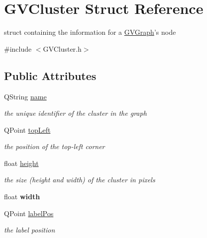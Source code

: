 \hypertarget{struct_g_v_cluster}{\section{\-G\-V\-Cluster \-Struct \-Reference}
\label{struct_g_v_cluster}
}


struct containing the information for a \hyperlink{class_g_v_graph}{\-G\-V\-Graph}'s node  




{\ttfamily \#include $<$\-G\-V\-Cluster.\-h$>$}

\subsection*{\-Public \-Attributes}
\begin{DoxyCompactItemize}
\item 
\hypertarget{struct_g_v_cluster_a24bc2aff9c2fb442ecdf2beea9149083}{\-Q\-String \hyperlink{struct_g_v_cluster_a24bc2aff9c2fb442ecdf2beea9149083}{name}}\label{struct_g_v_cluster_a24bc2aff9c2fb442ecdf2beea9149083}

\begin{DoxyCompactList}\small\item\em the unique identifier of the cluster in the graph \end{DoxyCompactList}\item 
\hypertarget{struct_g_v_cluster_a14f3667939642696081fa76dadb124a4}{\-Q\-Point \hyperlink{struct_g_v_cluster_a14f3667939642696081fa76dadb124a4}{top\-Left}}\label{struct_g_v_cluster_a14f3667939642696081fa76dadb124a4}

\begin{DoxyCompactList}\small\item\em the position of the top-\/left corner \end{DoxyCompactList}\item 
\hypertarget{struct_g_v_cluster_a2fd97f94a1a92153039dd6a4ac5ba5d4}{float \hyperlink{struct_g_v_cluster_a2fd97f94a1a92153039dd6a4ac5ba5d4}{height}}\label{struct_g_v_cluster_a2fd97f94a1a92153039dd6a4ac5ba5d4}

\begin{DoxyCompactList}\small\item\em the size (height and width) of the cluster in pixels \end{DoxyCompactList}\item 
\hypertarget{struct_g_v_cluster_a88d166bcf31587ac7482c997f0c17f15}{float {\bfseries width}}\label{struct_g_v_cluster_a88d166bcf31587ac7482c997f0c17f15}

\item 
\hypertarget{struct_g_v_cluster_a53d0a695bef9a7231eaba118a859a28f}{\-Q\-Point \hyperlink{struct_g_v_cluster_a53d0a695bef9a7231eaba118a859a28f}{label\-Pos}}\label{struct_g_v_cluster_a53d0a695bef9a7231eaba118a859a28f}

\begin{DoxyCompactList}\small\item\em the label position \end{DoxyCompactList}\end{DoxyCompactItemize}


